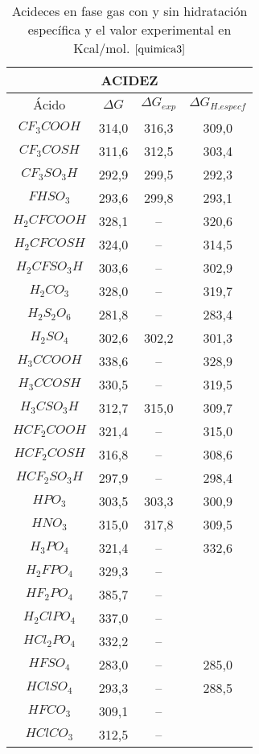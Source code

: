  \begin{table}[H]
     \centering
     \begin{tabular}{|c|c|c|c|}
     \hline
     \multicolumn{4}{|c|}{\bfseries{ACIDEZ}} \\ \hline
     Ácido & $\Delta G$ & $\Delta G_{exp}$ & $\Delta G_{ H. especf}$ \\ \hline
$CF_3COOH$ & 314,0 & 316,3 & 309,0\\ \hline
$CF_3COSH$ & 311,6 & 312,5 & 303,4\\ \hline
$CF_3SO_3H$ & 292,9 & 299,5 &292,3\\ \hline
$FHSO_3$ & 293,6 & 299,8 & 293,1\\ \hline
$H_2CFCOOH$ & 328,1 &-- & 320,6\\ \hline
$H_2CFCOSH$ & 324,0 & --& 314,5\\ \hline
$H_2CFSO_3H$ & 303,6 & -- & 302,9\\ \hline
$H_2CO_3$ & 328,0	& -- & 319,7\\ \hline
$H_2S_2O_6$ & 281,8 & -- & 283,4\\ \hline
$H_2SO_4$ & 302,6	& 302,2 & 301,3\\ \hline
$H_3CCOOH$ & 338,6 & -- &	328,9\\ \hline
$H_3CCOSH$ & 330,5 & -- &	319,5\\ \hline
$H_3CSO_3H$ & 312,7 & 315,0 & 309,7\\ \hline
$HCF_2COOH$ & 	321,4 & -- & 315,0\\ \hline
$HCF_2COSH$ & 	316,8 & -- & 308,6\\ \hline
$HCF_2SO_3H$ & 	297,9 & -- & 298,4\\ \hline
$HPO_3$ & 303,5 & 303,3 & 300,9\\ \hline
$HNO_3$ & 315,0 & 317,8 & 309,5\\ \hline
$H_3PO_4$ & 321,4	& -- & 332,6 \\ \hline
$H_2FPO_4$ & 329,3 & -- &\\ \hline
$HF_2PO_4$ & 385,7 & -- &  \\ \hline
$H_2ClPO_4$ & 337,0 & -- &\\ \hline
$HCl_2PO_4$ & 332,2 & -- &\\ \hline
$HFSO_4$ & 283,0 & -- & 285,0 \\ \hline
$HClSO_4$ & 293,3 & -- & 288,5\\ \hline
$HFCO_3$ & 309,1 & -- &\\ \hline
$HClCO_3$ & 312,5 & -- &\\ \hline


     \end{tabular}
     \caption{Acideces en fase gas con y sin hidratación específica y el valor experimental en Kcal/mol. $\cite{quimica3}$ }
     \label{tab:3.7}
 \end{table}

